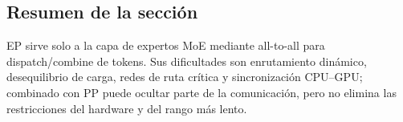 
\subsection{Resumen de la sección}

EP sirve solo a la capa de expertos MoE mediante all-to-all para dispatch/combine de tokens. Sus dificultades son enrutamiento dinámico, desequilibrio de carga, redes de ruta crítica y sincronización CPU--GPU; combinado con PP puede ocultar parte de la comunicación, pero no elimina las restricciones del hardware y del rango más lento.


